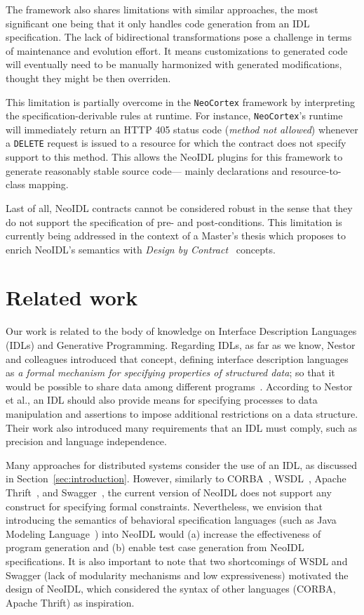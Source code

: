 \documentclass{ws-ijseke}
\newcommand{\neoidl}{NeoIDL}
\newcommand{\neocortex}{\texttt{NeoCortex}}
\begin{document}
The framework also shares limitations with similar approaches, the most
significant one being that it only handles code generation from an IDL
specification. The lack of bidirectional transformations pose a challenge in
terms of maintenance and evolution effort. It means 
customizations to generated code will eventually need to be 
manually harmonized with generated modifications, 
thought they might be then overriden.

This limitation is partially overcome in the \neocortex{} framework by
interpreting the specification-derivable rules at runtime. For instance,
\neocortex{}'s runtime will immediately return an HTTP 405 status 
code (\emph{method not allowed}) whenever a \texttt{DELETE} request 
is issued to a resource for which the contract does not specify 
support to this method. This allows the \neoidl{} plugins for this 
framework to generate reasonably stable source code--- mainly declarations 
and resource-to-class mapping.

Last of all, \neoidl{} contracts cannot be considered robust in the sense that
they do not support the specification of pre- and post-conditions.
This limitation is currently being addressed in the context of a Master's thesis
which proposes to enrich \neoidl{}'s semantics with 
\emph{Design by Contract}~\cite{MeyerDbC} concepts.

\section{Related work}\label{sec:related}

Our work is related to the body of knowledge on 
Interface Description Languages (IDLs) 
and Generative Programming. Regarding IDLs, as far as we know, 
Nestor and colleagues introduced that concept, defining interface description 
languages as \emph{a formal mechanism for specifying properties of
  structured data}; so that it would be possible to share data among
different programs~\cite{nestor-idl}. According to Nestor et al., an 
IDL should also provide means for specifying processes to data
manipulation and assertions to impose additional restrictions 
on a data structure. Their work also introduced many requirements 
that an IDL must comply, such as precision and language independence.  

Many approaches for distributed systems consider the use of an IDL, as 
discussed in Section~\ref{sec:introduction}. However, similarly to CORBA~\cite{corba},
WSDL~\cite{w3c-wsdl}, Apache Thrift~\cite{thrift}, and Swagger~\cite{swagger}, the current version of \neoidl{}
does not support any construct for specifying formal
constraints. Nevertheless, we envision that introducing the semantics of 
behavioral specification languages (such as Java Modeling Language~\cite{jml})
into \neoidl{} would (a) increase the effectiveness of program
generation and (b) enable test case generation from \neoidl{}
specifications. It is also important to note that two shortcomings of
WSDL and Swagger (lack of modularity mechanisms and low expressiveness)
motivated the design of \neoidl, which considered the syntax of other languages
(CORBA, Apache Thrift) as inspiration. 
\end{document}
